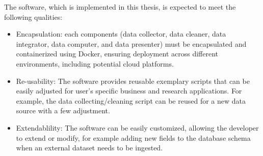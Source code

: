 The software, which is implemented in this thesis, is expected to meet the following qualities:
\begin{itemize}
     \item {Encapsulation}: each components (data collector, data cleaner, data integrator, data computer, and data presenter) must be encapsulated and containerized using Docker, ensuring deployment across different environments, including potential cloud platforms.
     \item {Re-usability}: The software provides reusable exemplary scripts that can be easily adjusted for user's specific business and research applications. For example, the data collecting/cleaning script can be reused for a new data source with a few adjustment.
     \item {Extendablility:} 
     The software can be easily customized, allowing the developer to extend or modify, for example adding new fields to the database schema when an external dataset needs to be ingested.
\end{itemize} 




